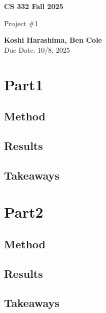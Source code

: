 \documentclass[11pt]{article}
\renewenvironment{shaded}{%
  \def\FrameCommand{\fboxsep=\FrameSep \colorbox{shadecolor}}%
  \MakeFramed{\advance\hsize-\width \FrameRestore\FrameRestore}}%
 {\endMakeFramed}
\begin{document}
\begin{titlepage}
   \begin{center}
       \vspace*{9cm}

       \textbf{CS 332 Fall 2025}

       \vspace{0.5cm}
        Project \#1
        \vfill

       \textbf{Koshi Harashima, Ben Cole}\\
       Due Date: 10/8, 2025
            
   \end{center}
\end{titlepage}

\pagebreak



\section{Part1}
\begin{shaded}
\subsection*{Method}



\subsection*{Results}



\subsection*{Takeaways}


\end{shaded}

\pagebreak

\section{Part2}
\begin{shaded}
\subsection*{Method}



\subsection*{Results}



\subsection*{Takeaways}


\end{shaded}
\end{document}
